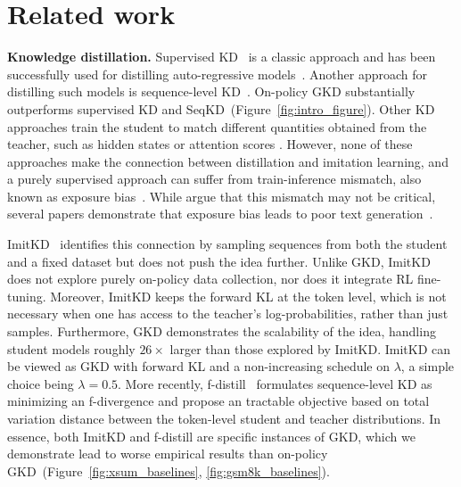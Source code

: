 \documentclass{article} %
\def\alg{GKD}
\newcommand{\revise}[1]{#1}
\newcommand{\addtext}[1]{#1}
\begin{document}
\vspace{-0.25cm}
\section{Related work}
\vspace{-0.25cm}
\textbf{Knowledge distillation.} Supervised KD~\citep{bucilua2006model, hinton2015distilling} is a classic approach and has been successfully used for distilling auto-regressive models~\citep{sanh2019distilbert}. Another approach for distilling such models is sequence-level KD~\citep{kim2016sequence}. On-policy GKD substantially outperforms supervised KD and SeqKD~(Figure~\ref{fig:intro_figure}). 
Other KD approaches train the student to match different quantities obtained from the teacher, such as hidden states \citep{jiao2020tinybert} or attention scores \citep{wang2020minilm}. However, none of these approaches make the connection between distillation and imitation learning, and a purely supervised approach can suffer from train-\revise{inference} mismatch, also known as exposure bias~\citep{ranzato2015sequence, bengio2015scheduled}. \addtext{While \citet{he2019exposure} argue that this mismatch may not be critical, several papers demonstrate that exposure bias leads to poor text generation~\citep{zhang-etal-2019-bridging, chiang2021relating, arora2022exposure}.}


ImitKD~\citep{lin2020autoregressive} identifies this connection by sampling sequences from both the student and a fixed dataset but does not push the idea further. Unlike GKD, ImitKD does not explore purely on-policy data collection, nor does it integrate RL fine-tuning. Moreover, ImitKD keeps the forward KL at the token level, which is not necessary when one has access to the teacher's log-probabilities, rather than just samples. Furthermore, GKD demonstrates the scalability of the idea, handling student models roughly $26\times$ larger than those explored by ImitKD. ImitKD can be viewed as GKD with forward KL and a non-increasing schedule on $\lambda$, a simple choice being $\lambda = 0.5$.   More recently, f-distill~\citep{wen2023f} formulates sequence-level KD as minimizing an f-divergence and propose an tractable objective based on
total variation distance between the token-level student and teacher distributions. In essence, both ImitKD and f-distill are specific instances of \alg, which we demonstrate lead to worse empirical results than on-policy GKD~(Figure~\ref{fig:xsum_baselines}, \ref{fig:gsm8k_baselines}).
\end{document}
